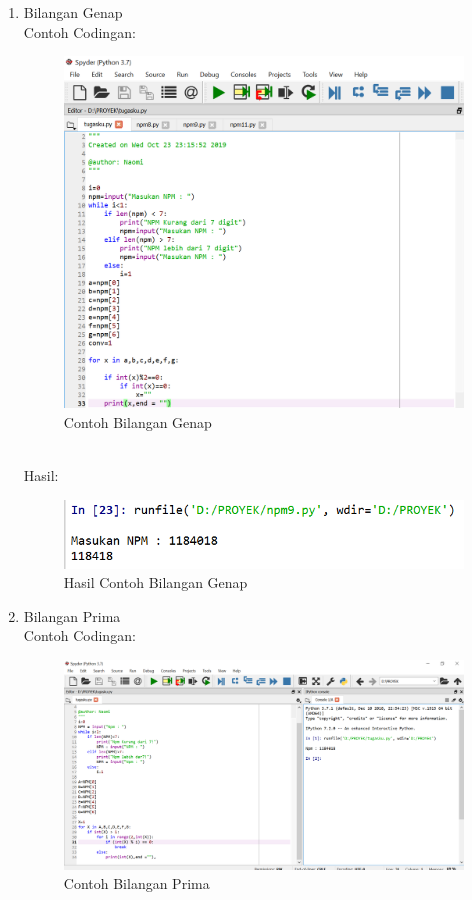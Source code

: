 \begin{enumerate}
    \newpage
    \item Bilangan Genap \\
    Contoh Codingan:
    \begin{figure}[!htbp]
    \centering
    \includegraphics[width=13cm]{gambar2/genap.png}
    \caption{Contoh Bilangan Genap}
    \end{figure}\\
    Hasil:
    \begin{figure}[!htbp]
    \centering
    \includegraphics[width=14cm]{gambar2/genap1.png}
    \caption{Hasil Contoh Bilangan Genap}
    \end{figure}
    
    \newpage
    \item Bilangan Prima \\
    Contoh Codingan:
    \begin{figure}[!htbp]
    \centering
    \includegraphics[width=13cm]{gambar2/prim.png}
    \caption{Contoh Bilangan Prima}
    \end{figure}
\end{enumerate}




